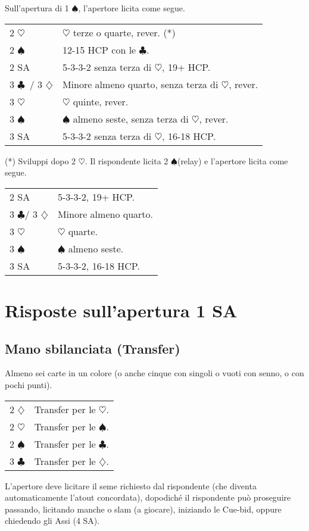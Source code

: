 \documentclass[a4paper,10pt]{article}
\renewcommand{\c}{$\clubsuit$\xspace}
\renewcommand{\d}{$\diamondsuit$\xspace}
\newcommand{\h}{$\heartsuit$\xspace}
\newcommand{\s}{$\spadesuit$\xspace}
\newcommand{\sa}{SA\xspace}
\newcommand{\smallspace}{\vskip0.3cm}
\newenvironment{twocol}
  {\smallspace\noindent\begin{tabular}{l p{0.78\textwidth}}}
  {\end{tabular}\smallspace}
\begin{document}
\noindent Sull'apertura di 1 \s, l'apertore licita come segue.

\begin{twocol}
  2 \h & \h terze o quarte, rever. (*)\\
  2 \s & 12-15 HCP con le \c. \\
  2 \sa & 5-3-3-2 senza terza di \h, 19+ HCP. \\
  3 \c\ / 3 \d & Minore almeno quarto, senza terza di \h, rever. \\
  3 \h & \h quinte, rever. \\
  3 \s & \s almeno seste, senza terza di \h, rever. \\
  3 \sa & 5-3-3-2 senza terza di \h, 16-18 HCP.
\end{twocol}

\noindent (*) Sviluppi dopo 2 \h. Il rispondente licita 2 \s (relay) e l'apertore licita come segue.
\begin{twocol}
  2 \sa & 5-3-3-2, 19+ HCP. \\
  3 \c / 3 \d & Minore almeno quarto. \\
  3 \h & \h quarte. \\
  3 \s & \s almeno seste. \\
  3 \sa & 5-3-3-2, 16-18 HCP.
\end{twocol}


\pagebreak

\section{Risposte sull'apertura 1 SA}

\subsection{Mano sbilanciata (Transfer)}

Almeno sei carte in un colore (o anche cinque con singoli o vuoti con senno, o con pochi punti).

\begin{twocol}
 2 \d & Transfer per le \h.\\
 2 \h & Transfer per le \s.\\
 2 \s & Transfer per le \c.\\
 3 \c & Transfer per le \d.\\
\end{twocol}

L'apertore deve licitare il seme richiesto dal rispondente (che diventa automaticamente l'atout concordata), dopodiché il rispondente può proseguire passando, licitando manche o slam (a giocare), iniziando le Cue-bid, oppure chiedendo gli Assi (4 \sa).
\end{document}
